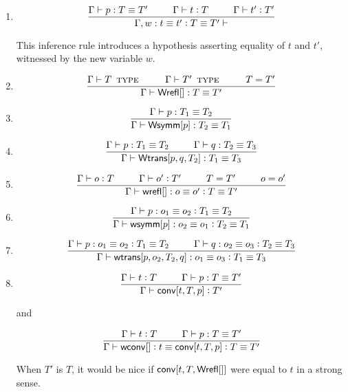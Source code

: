 \documentclass[11pt]{article}
\newcommand{\eqd}{\equiv}
\newcommand\spc{{\hskip 26pt}}
\newcommand{\ccolon}{\vcentcolon}
\newcommand{\ccheck}{\vcentcolon}            %
\newcommand{\TYPE}{\mathop{\text{ \sc type}}}
\newcommand{\Okay}{\mathop{\text{ \sc okay}}}
\newcommand{\Context}{\vdash\Okay}
\renewcommand{\Context}{\vdash}
\newcommand{\ha}[2]{#1[#2]}
\newcommand{\Wrefl}{{\sf Wrefl}}
\newcommand{\Wtrans}{{\sf Wtrans}}
\newcommand{\Wsymm}{{\sf Wsymm}}
\newcommand{\conv}{{\sf conv}}
\newcommand{\wconv}{{\sf wconv}}
\newcommand{\wrefl}{{\sf wrefl}}
\newcommand{\wsymm}{{\sf wsymm}}
\newcommand{\wtrans}{{\sf wtrans}}
\begin{document}
\begin{enumerate}
This inference rule introduces a hypothesis asserting equality of $T$ and $T'$ witnessed
by the new variable $w$.

\item
  \[\frac{
  \Gamma \vdash p : T \eqd T'
  \spc
  \Gamma \vdash t \ccolon T
  \spc
  \Gamma \vdash t' \ccolon T'
  } {
  \Gamma, w : t \eqd t' \ccolon T \eqd T' \Context}\]

This inference rule introduces a hypothesis asserting equality of $t$ and $t'$,
witnessed by the new variable $w$.

\item 
\[\frac{\Gamma \vdash T \TYPE \spc \Gamma \vdash T' \TYPE \spc T = T'}
       {\Gamma \vdash \ha\Wrefl{}: T\eqd T'}
\]

\item 
\[\frac{\Gamma \vdash p:T_1\eqd T_2 }{\Gamma \vdash \ha\Wsymm{p}:T_2\eqd T_1}\]

\item 
\[
  \frac{
    \Gamma \vdash p:T_1\eqd T_2
    \spc
    \Gamma \vdash q:T_2\eqd T_3
  }
  {\Gamma \vdash \ha\Wtrans{p,q,T_2}: T_1\eqd T_3 }
\]

\item 
\[\frac{
  \Gamma \vdash o \ccheck{T}
  \spc
  \Gamma \vdash o' \ccheck{T'}
  \spc
  T = T'
  \spc
  o = o'
  } {
  \Gamma \vdash  \ha\wrefl{}: o \eqd o' \ccolon T \eqd T'
  } 
\]

\item 
\[\frac
    {\Gamma \vdash p:o_1\eqd o_2 \ccolon T_1 \eqd T_2}
    {\Gamma \vdash \ha\wsymm{p}:o_2\eqd o_1 \ccolon T_2 \eqd T_1}\]

\item 
\[\frac{\Gamma \vdash p:o_1\eqd o_2 \ccolon T_1 \eqd T_2
  \spc
  \Gamma \vdash q:o_2\eqd o_3 \ccolon T_2 \eqd T_3
  } {
  \Gamma \vdash \ha\wtrans{p,o_2,T_2,q}:o_1\eqd o_3 \ccolon T_1 \eqd T_3}
\]

\item 
\[\frac
    { \Gamma \vdash t \ccolon T \spc \Gamma \vdash p : T \eqd T'}
    { \Gamma \vdash \ha\conv{t,T,p} \ccolon T' }\]

and

\[\frac
    { \Gamma \vdash t \ccolon T \spc
      \Gamma \vdash p : T \eqd T' }
    { \Gamma \vdash \ha\wconv{} \ccolon t \eqd \ha\conv{t,T,p} \ccolon T \eqd T'}\]

When $T'$ is $T$, it would be nice if $\ha\conv{t,T,\ha\Wrefl{}}$ were equal to
$t$ in a strong sense.



\end{enumerate}
\end{document}
